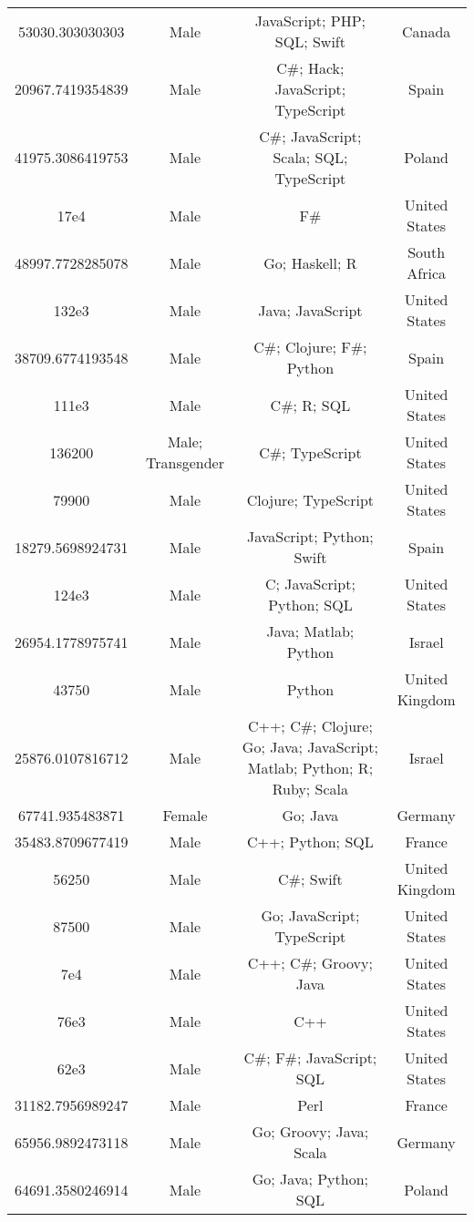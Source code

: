 \begin{center}
\begin{tabular}{ |c|c|c|c| }
53030.303030303  &  Male  &  JavaScript; PHP; SQL; Swift  &  Canada  \\ 
20967.7419354839  &  Male  &  C\#; Hack; JavaScript; TypeScript  &  Spain  \\ 
41975.3086419753  &  Male  &  C\#; JavaScript; Scala; SQL; TypeScript  &  Poland  \\ 
17e4  &  Male  &  F\#  &  United States  \\ 
48997.7728285078  &  Male  &  Go; Haskell; R  &  South Africa  \\ 
132e3  &  Male  &  Java; JavaScript  &  United States  \\ 
38709.6774193548  &  Male  &  C\#; Clojure; F\#; Python  &  Spain  \\ 
111e3  &  Male  &  C\#; R; SQL  &  United States  \\ 
136200  &  Male; Transgender  &  C\#; TypeScript  &  United States  \\ 
79900  &  Male  &  Clojure; TypeScript  &  United States  \\ 
18279.5698924731  &  Male  &  JavaScript; Python; Swift  &  Spain  \\ 
124e3  &  Male  &  C; JavaScript; Python; SQL  &  United States  \\ 
26954.1778975741  &  Male  &  Java; Matlab; Python  &  Israel  \\ 
43750  &  Male  &  Python  &  United Kingdom  \\ 
25876.0107816712  &  Male  &  C++; C\#; Clojure; Go; Java; JavaScript; Matlab; Python; R; Ruby; Scala  &  Israel  \\ 
67741.935483871  &  Female  &  Go; Java  &  Germany  \\ 
35483.8709677419  &  Male  &  C++; Python; SQL  &  France  \\ 
56250  &  Male  &  C\#; Swift  &  United Kingdom  \\ 
87500  &  Male  &  Go; JavaScript; TypeScript  &  United States  \\ 
7e4  &  Male  &  C++; C\#; Groovy; Java  &  United States  \\ 
76e3  &  Male  &  C++  &  United States  \\ 
62e3  &  Male  &  C\#; F\#; JavaScript; SQL  &  United States  \\ 
31182.7956989247  &  Male  &  Perl  &  France  \\ 
65956.9892473118  &  Male  &  Go; Groovy; Java; Scala  &  Germany  \\ 
64691.3580246914  &  Male  &  Go; Java; Python; SQL  &  Poland  \\ 

\end{tabular}
\end{center}
